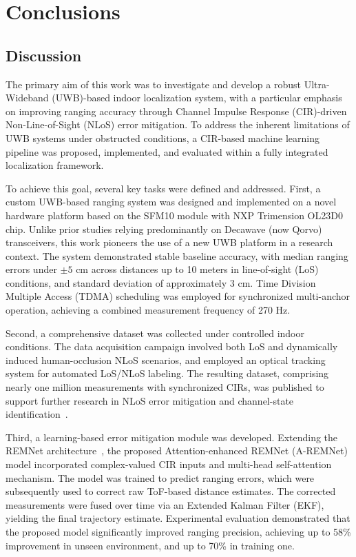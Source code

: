 \chapter{Conclusions}

\section{Discussion}
The primary aim of this work was to investigate and develop a robust Ultra-Wideband (UWB)-based indoor localization system, with a particular emphasis on improving ranging accuracy through Channel Impulse Response (CIR)-driven Non-Line-of-Sight (NLoS) error mitigation. To address the inherent limitations of UWB systems under obstructed conditions, a CIR-based machine learning pipeline was proposed, implemented, and evaluated within a fully integrated localization framework.

To achieve this goal, several key tasks were defined and addressed. First, a custom UWB-based ranging system was designed and implemented on a novel hardware platform based on the SFM10 module with NXP Trimension OL23D0 chip. Unlike prior studies relying predominantly on Decawave (now Qorvo) transceivers, this work pioneers the use of a new UWB platform in a research context. The system demonstrated stable baseline accuracy, with median ranging errors under $\pm 5$ cm across distances up to 10 meters in line-of-sight (LoS) conditions, and standard deviation of approximately 3 cm. Time Division Multiple Access (TDMA) scheduling was employed for synchronized multi-anchor operation, achieving a combined measurement frequency of 270 Hz.

Second, a comprehensive dataset was collected under controlled indoor conditions. The data acquisition campaign involved both LoS and dynamically induced human-occlusion NLoS scenarios, and employed an optical tracking system for automated LoS/NLoS labeling. The resulting dataset, comprising nearly one million measurements with synchronized CIRs, was published to support further research in NLoS error mitigation and channel-state identification~\cite{yaroshevych_2025_rangecir}.

Third, a learning-based error mitigation module was developed. Extending the REMNet architecture~\cite{Simone2021UWB}, the proposed Attention-enhanced REMNet (A-REMNet) model incorporated complex-valued CIR inputs and multi-head self-attention mechanism. The model was trained to predict ranging errors, which were subsequently used to correct raw ToF-based distance estimates. The corrected measurements were fused over time via an Extended Kalman Filter (EKF), yielding the final trajectory estimate. Experimental evaluation demonstrated that the proposed model significantly improved ranging precision, achieving up to 58\% improvement in unseen environment, and up to 70\% in training one.

